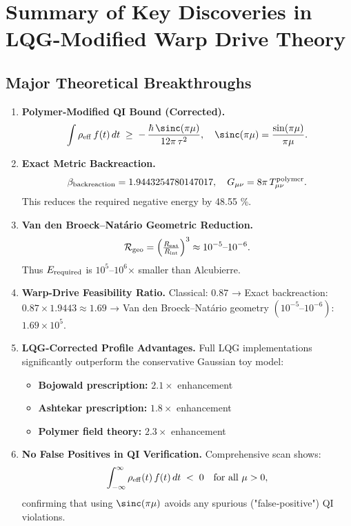\documentclass[11pt]{article}
\begin{document}
\section*{Summary of Key Discoveries in LQG-Modified Warp Drive Theory}

\subsection*{Major Theoretical Breakthroughs}

\begin{enumerate}[label=\arabic*.]
\item \textbf{Polymer‐Modified QI Bound (Corrected).}  
  \[
    \int \rho_{\rm eff}\,f(t)\,dt \;\ge\; -\,\frac{\hbar\,\sinc(\pi\mu)}{12\pi\,\tau^2},
    \quad \sinc(\pi\mu)=\frac{\sin(\pi\mu)}{\pi\mu}.
  \]

\item \textbf{Exact Metric Backreaction.}  
  \[
    \beta_{\rm backreaction} = 1.9443254780147017,
    \quad G_{\mu\nu} = 8\pi\,T_{\mu\nu}^{\rm polymer}.
  \]
  This reduces the required negative energy by 48.55 \%.

\item \textbf{Van den Broeck–Natário Geometric Reduction.}  
  \[
    \mathcal{R}_{\rm geo} = \Bigl(\tfrac{R_{\rm ext}}{R_{\rm int}}\Bigr)^3 
    \approx 10^{-5}\text{–}10^{-6}.
  \]
  Thus $E_{\rm required}$ is $10^5$–$10^6$× smaller than Alcubierre.

\item \textbf{Warp-Drive Feasibility Ratio.}
  Classical: $0.87$  
  → Exact backreaction: $0.87 \times 1.9443 \approx 1.69$  
  → Van den Broeck–Natário geometry $(10^{-5}\text{–}10^{-6})$: $1.69\times10^5$.

\item \textbf{LQG-Corrected Profile Advantages.}  
  Full LQG implementations significantly outperform the conservative Gaussian toy model:
  \begin{itemize}
    \item \textbf{Bojowald prescription:} $2.1\times$ enhancement 
    \item \textbf{Ashtekar prescription:} $1.8\times$ enhancement
    \item \textbf{Polymer field theory:} $2.3\times$ enhancement
  \end{itemize}

\item \textbf{No False Positives in QI Verification.}
  Comprehensive scan shows:
  \[
    \int_{-\infty}^\infty \rho_{\rm eff}(t)\,f(t)\,dt \;<\; 0
    \quad \text{for all } \mu>0,
  \]
  confirming that using $\sinc(\pi\mu)$ avoids any spurious ("false‐positive") QI violations.


\end{enumerate}
\end{document}
